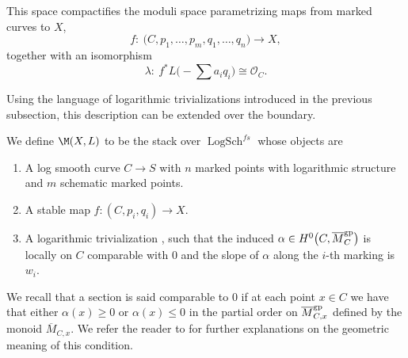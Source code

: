 This space compactifies the moduli space parametrizing maps from marked curves to $X$,
\[f\colon\ \bigl(C,p_1,\dots, p_m,q_1,\dots,q_n\bigr)\to X,\]
together with an isomorphism
\[\lambda\colon\ f^* L\biggl(-\sum a_i q_i\biggr)\cong\mathcal O_C.\]

Using the language of logarithmic trivializations introduced in the previous subsection, this description can be extended over the boundary.

\begin{defi}\label{def:logstablemaps}
 We define $\M(X,L)$ to be the stack over $\operatorname{LogSch}^{fs}$ whose objects are
 \begin{enumerate}\itemsep=0pt
 \item [(1)] A log smooth curve $C\to S$ with $n$ marked points with logarithmic structure and $m$ schematic marked points.
 \item [(2)] A stable map $f\colon (C,p_i,q_i)\to X$.
 \item [(3)] A logarithmic trivialization , such that the induced $\alpha\in H^0\bigl(C,\allowbreak\overline{M}_C^{\rm gp}\bigr)$ is locally on $C$ comparable with $0$ and the slope of $\alpha$ along the $i$-th marking is $w_i$.
 \end{enumerate}

We recall that a section  is said comparable to $0$ if at each point $x\in C$ we have that either $\alpha(x)\geq 0$ or $\alpha(x)\leq 0$ in the partial order on $\overline{M}^{\rm gp}_{C,x}$ defined by the monoid $\overline{M}_{C,x}$. We refer the reader to \cite[Section~2.5]{RSPW2} for further explanations on the geometric meaning of this condition.
\end{defi}

